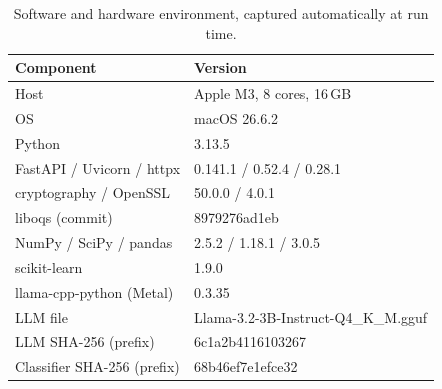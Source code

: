 \begin{table}[t]
\centering
\caption{Software and hardware environment, captured automatically at run time.}
\label{tab:environment}
\footnotesize
\setlength{\tabcolsep}{3pt}
\begin{tabular}{@{}ll@{}}
\toprule
Component & Version \\
\midrule
Host & Apple M3, 8 cores, 16\,GB \\
OS & macOS 26.6.2 \\
Python & 3.13.5 \\
FastAPI / Uvicorn / httpx & 0.141.1 / 0.52.4 / 0.28.1 \\
cryptography / OpenSSL & 50.0.0 / 4.0.1 \\
liboqs (commit) & 8979276ad1eb \\
NumPy / SciPy / pandas & 2.5.2 / 1.18.1 / 3.0.5 \\
scikit-learn & 1.9.0 \\
llama-cpp-python (Metal) & 0.3.35 \\
LLM file & Llama-3.2-3B-Instruct-Q4\_K\_M.gguf \\
LLM SHA-256 (prefix) & 6c1a2b4116103267 \\
Classifier SHA-256 (prefix) & 68b46ef7e1efce32 \\
\bottomrule
\end{tabular}
\end{table}
